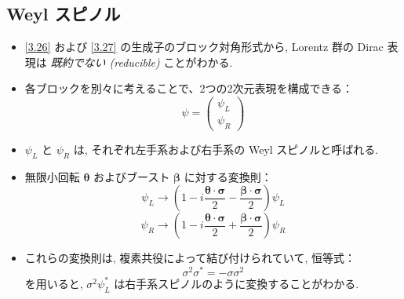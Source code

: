 \documentclass[a4paper,12pt]{article}
\begin{document}
  \subsection*{Weyl スピノル}
  \begin{itemize}
    \item \eqref{3.26} および \eqref{3.27} の生成子のブロック対角形式から, Lorentz 群の Dirac 表現は \textit{既約でない (reducible)} ことがわかる.
    \item 各ブロックを別々に考えることで、2つの2次元表現を構成できる：
    \begin{equation*}
    \psi = \begin{pmatrix} \psi_L \\ \psi_R \end{pmatrix} \tag{3.36}
    \end{equation*}
    \item $\psi_L$ と $\psi_R$ は, それぞれ左手系および右手系の Weyl スピノルと呼ばれる.
    \item 無限小回転 $\boldsymbol{\theta}$ およびブースト $\boldsymbol{\beta}$ に対する変換則：
    \begin{equation*}
    \psi_L \rightarrow \left(1 - i \frac{\boldsymbol{\theta} \cdot \boldsymbol{\sigma}}{2} - \frac{\boldsymbol{\beta} \cdot \boldsymbol{\sigma}}{2} \right) \psi_L
    \end{equation*}
    \begin{equation*}
    \psi_R \rightarrow \left(1 - i \frac{\boldsymbol{\theta} \cdot \boldsymbol{\sigma}}{2} + \frac{\boldsymbol{\beta} \cdot \boldsymbol{\sigma}}{2} \right) \psi_R \tag{3.37}
    \end{equation*}
    \item これらの変換則は, 複素共役によって結び付けられていて, 恒等式：
    \begin{equation*}
    \sigma^2 \sigma^* = -\sigma \sigma^2 \tag{3.38}
    \end{equation*}
    を用いると, $\sigma^2 \psi_L^*$ は右手系スピノルのように変換することがわかる.
    

\end{itemize}
\end{document}
